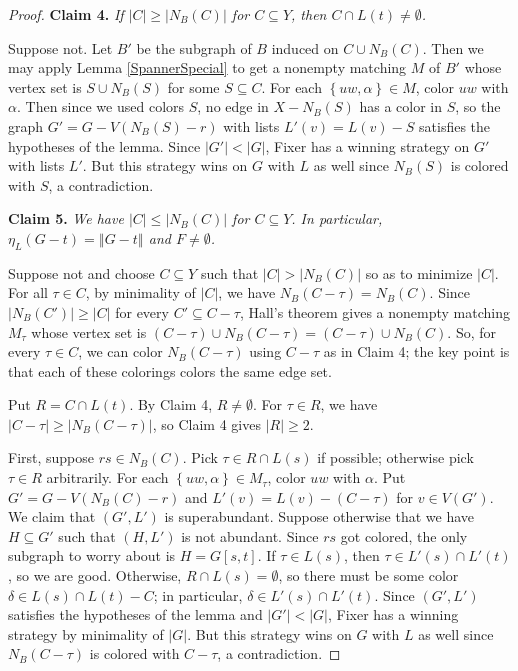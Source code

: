 \documentclass[12pt,reqno]{amsart}
\theoremstyle{plain}
\theoremstyle{definition}
\theoremstyle{remark}
\newcommand{\set}[1]{\left\{ #1 \right\}}
\newcommand{\card}[1]{\left|#1\right|}
\newcommand{\size}[1]{\left\Vert#1\right\Vert}
\begin{document}
\begin{proof}
\noindent\textbf{Claim 4.  }\textit{If $\card{C} \ge \card{N_B(C)}$ for $C \subseteq Y$, then $C \cap L(t) \ne \emptyset$.}

Suppose not. Let $B'$ be the subgraph of $B$ induced on $C \cup N_B(C)$. Then we may apply Lemma \ref{SpannerSpecial} to get a nonempty matching $M$ of $B'$ whose vertex set is $S \cup N_B(S)$ for some $S \subseteq C$.  For each $\set{uw, \alpha} \in M$, color $uw$ with $\alpha$.  Then since we used colors $S$, no edge in $X - N_B(S)$ has a color in $S$, so the graph $G' = G - V(N_B(S) - r)$ with lists $L'(v) = L(v) - S$ satisfies the hypotheses of the lemma.  Since $\card{G'} < \card{G}$, Fixer has a winning strategy on $G'$ with lists $L'$.  But this strategy wins on $G$ with $L$ as well since $N_B(S)$ is colored with $S$, a contradiction. 
 
\noindent\textbf{Claim 5.  }\textit{We have $\card{C} \le \card{N_B(C)}$ for $C \subseteq Y$. In particular, $\eta_L(G-t) = \size{G-t}$ and $F \ne \emptyset$.}

Suppose not and choose $C \subseteq Y$ such that $\card{C} > \card{N_B(C)}$ so as to minimize $\card{C}$.  For all $\tau \in C$, by minimality of $\card{C}$, we have $N_B(C - \tau) = N_B(C)$.  Since $\card{N_B(C')} \ge \card{C}$ for every $C' \subseteq C - \tau$, Hall's theorem gives a nonempty matching $M_\tau$ whose vertex set is $(C - \tau) \cup N_B(C-\tau) = (C - \tau) \cup N_B(C)$.  So, for every $\tau \in C$, we can color $N_B(C - \tau)$ using $C - \tau$ as in Claim 4; the key point is that each of these colorings colors the same edge set.

Put $R = C \cap L(t)$.  By Claim 4, $R \ne \emptyset$.  For $\tau \in R$, we have $\card{C - \tau} \ge \card{N_B(C - \tau)}$, so Claim 4 gives $\card{R} \ge 2$. 

First, suppose $rs \in N_B(C)$. Pick $\tau \in R \cap L(s)$ if possible; otherwise pick $\tau \in R$ arbitrarily. For each $\set{uw, \alpha} \in M_\tau$, color $uw$ with $\alpha$.  Put $G' = G - V(N_B(C) - r)$ and $L'(v) = L(v) - (C - \tau)$ for $v \in V(G')$.  We claim that $(G', L')$ is superabundant.  Suppose otherwise that we have $H \subseteq G'$ such that $(H, L')$ is not abundant.  Since $rs$ got colored, the only subgraph to worry about is $H = G[s,t]$.  If $\tau \in L(s)$, then $\tau \in L'(s) \cap L'(t)$, so we are good.  Otherwise, $R \cap L(s) = \emptyset$, so there must be some color $\delta \in L(s) \cap L(t) - C$; in particular, $\delta \in L'(s) \cap L'(t)$.  Since $(G', L')$ satisfies the hypotheses of the lemma and $\card{G'} < \card{G}$, Fixer has a winning strategy by minimality of $\card{G}$.  But this strategy wins on $G$ with $L$ as well since $N_B(C - \tau)$ is colored with $C - \tau$, a contradiction. 


\end{proof}
\end{document}

